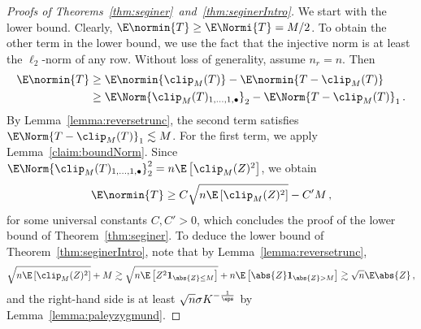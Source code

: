 \documentclass[11pt,a4paper]{article}
\begin{document}
\begin{proof}[Proofs of Theorems~\ref{thm:seginer}~and~\ref{thm:seginerIntro}]
    We start with the lower bound.
    Clearly, $\E \normin{T}\ge \E \Normi{T}= M/2$. To obtain the other term in the lower bound, we use the fact that the injective norm is at least the $\ell_2$-norm of any row. Without loss of generality, assume $n_r = n$. Then 
    \begin{align}
        \E \normin{T} &\geq \E \normin{\clip_M(T)} - \E \normin{T - \clip_M(T)}\nonumber\\
        &\geq \E \Norm{\clip_M(T)_{1, \ldots,1,\bullet}}_2 - \E \Norm{T - \clip_M(T)}_1\,.\label{eq:colminustrunc}
    \end{align}
    By Lemma~\ref{lemma:reversetrunc},
    the second term satisfies $\E \Norm{T - \clip_M(T)}_1\lesssim M$.
    For the first term, we apply Lemma~\ref{claim:boundNorm}. Since
    $\E \Norm{\clip_M(T)_{1, \ldots,1,\bullet}}^2_2 = n \E \left[\clip_M(Z)^2\right]$, we obtain
    \[
        \E \normin{T} \ge C \sqrt{ {n \E \left[\clip_M(Z)^2\right]}} - C' M\,,
    \]
    for some universal constants $C,C'>0$,
    which concludes the proof of the lower bound of Theorem~\ref{thm:seginer}. To deduce the lower bound of Theorem~\ref{thm:seginerIntro}, note that by Lemma~\ref{lemma:reversetrunc},
    \[
        \sqrt{n \E\left[\clip_M(Z)^2\right]} + M  \gtrsim \sqrt{n \E\left[Z^2\mathbf{1}_{\abs{Z} \leq M}\right]} + n \E \left[\abs{Z}\mathbf{1}_{\abs{Z} > M}\right] \gtrsim \sqrt{n}\E \abs{Z} \, ,
    \]  
    and the right-hand side is at least $\sqrt{n}\sigma K^{-\frac 1 \eps}$ by Lemma~\ref{lemma:paleyzygmund}.
    

\end{proof}
\end{document}
